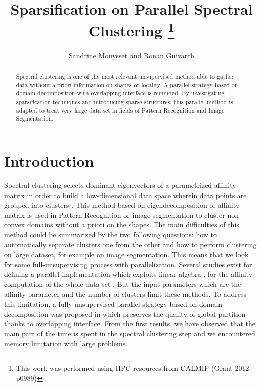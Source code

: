 \documentclass{llncs}
\begin{document}
\title{Sparsification on Parallel Spectral Clustering
\thanks{This work was performed using HPC resources from CALMIP (Grant 2012-p0989)}}

\author{Sandrine Mouysset and Ronan Guivarch}


\maketitle

\begin{abstract}
Spectral clustering is one of the most relevant unsupervised method able to
gather data without a priori information on shapes or locality. A parallel
strategy based on domain decomposition with overlapping interface is
reminded. By investigating  sparsification techniques and introducing sparse
structures, this parallel method is  adapted to treat very large data set in
fields of Pattern Recognition and Image Segmentation.
\end{abstract}
%
\section{Introduction}

Spectral clustering selects dominant eigenvectors of a parametrized affinity
matrix in order to build a low-dimensional data space wherein data points are
grouped into clusters \cite{speC}. This method based on eigendecomposition of affinity matrix is used in Pattern Recognition or  image segmentation  to cluster non-convex domains without a priori on the shapes. 
The main difficulties of this method could be
summarized by
the two following questions: how to automatically separate clusters one from
the other and how to perform clustering on large dataset, for example on image
segmentation. This means that we look for some full-unsupervising process with
parallelization.
Several studies exist for defining a parallel implementation which exploits linear
algebra \cite{song}, \cite{fowlkes} for the affinity computation of the whole data set
\cite{Chen10}. But the input parameters which are the affinity parameter and
the number of clusters limit these methods.
To address this limitation, a fully unsupervised parallel strategy based on
domain decomposition was proposed in \cite{mouysset3} which preserves the
quality of global partition thanks to overlapping interface. From the first
results, we have observed that the main part of the time is spent in the
spectral clustering step and we encountered memory limitation with large
problems.
\end{document}
